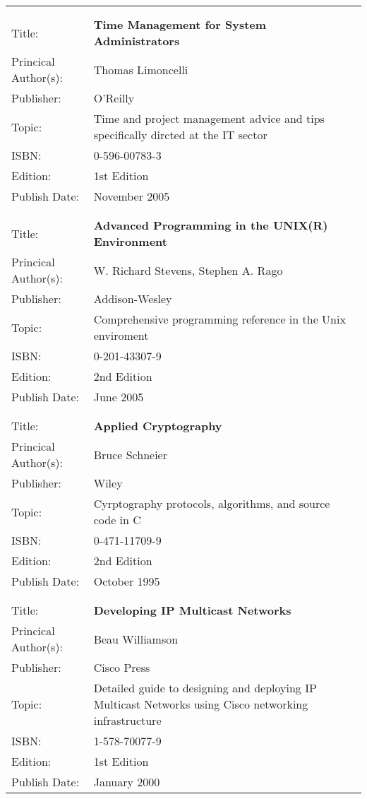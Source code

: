 \documentclass[a4paper,12pt]{article}
\begin{document}
\begin{tabular}{ll}
	&	\\
	&	\\
	
Title: &	\textbf{Time Management for System Administrators}	\\
Princical Author(s): &	Thomas Limoncelli  \\
Publisher:&	O'Reilly	\\	
Topic:	&	Time and project management advice and tips specifically dircted at the IT sector \\
ISBN:		&	0-596-00783-3 \\
Edition:	&	1st Edition \\
Publish Date:	&	November 2005 \\

	&	\\
	&	\\
	
Title: &	\textbf{Advanced Programming in the UNIX(R) Environment}	\\
Princical Author(s): &	W. Richard Stevens, Stephen A. Rago  \\
Publisher:&	Addison-Wesley	\\	
Topic:	&	Comprehensive programming reference in the Unix enviroment \\
ISBN:		&	0-201-43307-9 \\
Edition:	&	2nd Edition \\
Publish Date:	&	June 2005 \\

	&	\\
	&	\\

Title: &	\textbf{Applied Cryptography}	\\
Princical Author(s): &	Bruce Schneier  \\
Publisher:&	Wiley	\\	
Topic:	&	Cyrptography protocols, algorithms, and source code in C \\
ISBN:		&	0-471-11709-9 \\
Edition:	&	2nd Edition \\
Publish Date:	&	October 1995 \\

	&	\\
	&	\\

Title: &	\textbf{Developing IP Multicast Networks}	\\
Princical Author(s): &	Beau Williamson  \\
Publisher:&	Cisco Press	\\	
Topic:	&	Detailed guide to designing and deploying IP Multicast Networks using Cisco networking infrastructure \\
ISBN:		&	1-578-70077-9 \\
Edition:	&	1st Edition \\
Publish Date:	&	January 2000 \\


\end{tabular}
\end{document}
